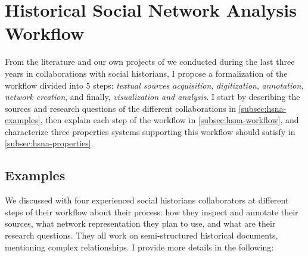 

\section{Historical Social Network Analysis Workflow}\label{sec:hsna-workflow}


From the literature and our own projects of \hsna we conducted during the last three years in collaborations with social historians, I propose a formalization of the \hsna workflow divided into 5 steps: \textit{textual sources acquisition}, \textit{digitization}, \textit{annotation}, \textit{network creation}, and finally, \textit{visualization and analysis}.
I start by describing the sources and research questions of the different collaborations in \autoref{subsec:hsna-examples}, then explain each step of the workflow in \autoref{subsec:hsna-workflow}, and characterize three properties \va systems supporting this workflow should satisfy in \autoref{subsec:hsna-properties}.


\subsection{Examples}\label{subsec:hsna-examples}

We discussed with four experienced social historians collaborators at different steps of their \hsna workflow about their process: how they inspect and annotate their sources, what network representation they plan to use, and what are their research questions.
They all work on semi-structured historical documents, mentioning complex relationships.
I provide more details in the following:

